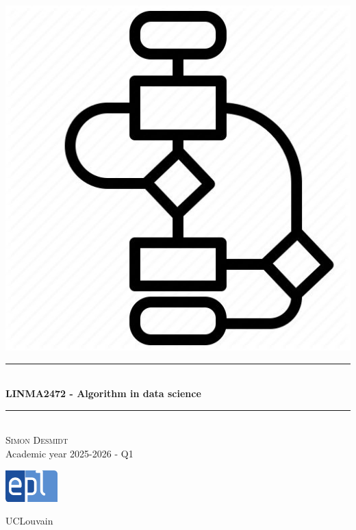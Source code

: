 \documentclass[12pt, openany]{report}
\newcommand{\HRule}{\rule{\linewidth}{0.5mm}}
\theoremstyle{definition}
\begin{document}
\begin{titlepage}
    \begin{sffamily}
    \begin{center}
        \includegraphics[scale=0.3]{img/page_de_garde.jpg} \\[1cm]
        \HRule \\[0.4cm]
        { \huge \bfseries LINMA2472 - Algorithm in data science \\[0.4cm] }
    
        \HRule \\[1.5cm]
        \textsc{\LARGE Simon Desmidt}\\[1cm]
        \vfill
        \vspace{2cm}
        {\large Academic year 2025-2026 - Q1}
        \vspace{0.4cm}
         
        \includegraphics[width=0.15\textwidth]{img/epl.png}
        
        UCLouvain\\
    
    \end{center}
    \end{sffamily}
\end{titlepage}
\end{document}
